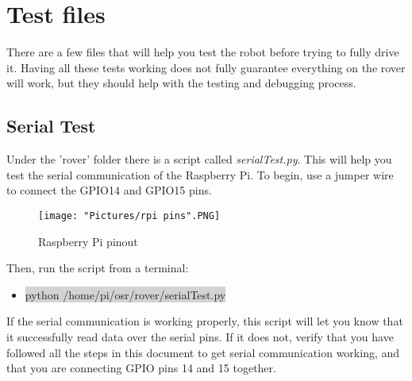 \documentclass[12pt]{article}
\begin{document}
\section{Test files}
There are a few files that will help you test the robot before trying to fully drive it. Having all these tests working does not fully guarantee everything on the rover will work, but they should help with the testing and debugging process.

\subsection{Serial Test}

Under the 'rover' folder there is a script called \textit{serialTest.py}. This will help you test the serial communication of the Raspberry Pi. To begin, use a jumper wire to connect the GPIO14 and GPIO15 pins. 

\begin{figure}[H]
 	\centering
	\texttt{[image: "Pictures/rpi pins".PNG]}
 	\caption{Raspberry Pi pinout}
	\label{rpi pin}
\end{figure}


Then, run the script from a terminal:
\begin{itemize}
	\item[] \colorbox{lightgray}{python /home/pi/osr/rover/serialTest.py}
\end{itemize}

If the serial communication is working properly, this script will let you know that it successfully read data over the serial pins. If it does not, verify that you have followed all the steps in this document to get serial communication working, and that you are connecting GPIO pins 14 and 15 together. 
\end{document}
